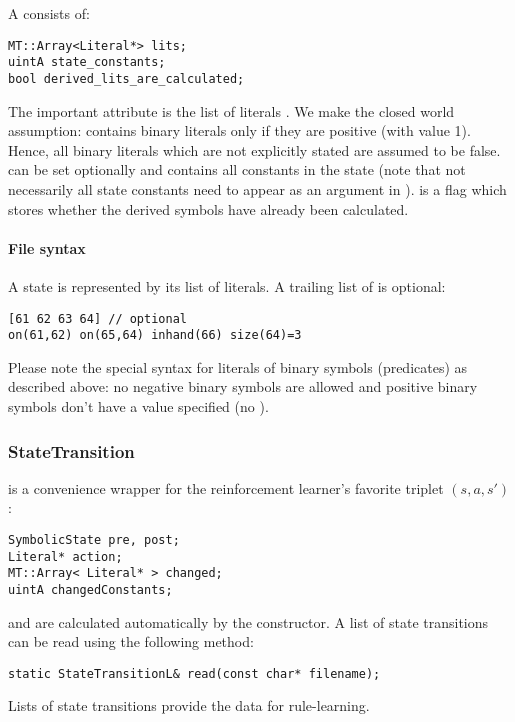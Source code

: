 \documentclass[10pt,twoside,twocolumn,fleqn]{article}
\begin{document}
A  consists of:
\begin{lstlisting}
MT::Array<Literal*> lits;
uintA state_constants;
bool derived_lits_are_calculated;
\end{lstlisting}
The important attribute is the list of literals . We make the 
closed world assumption:  contains binary literals only if
they are positive (with value 1). Hence, all binary literals which are not
explicitly stated are assumed to be false.  can be
set optionally and contains all constants in the state (note that not
necessarily all state constants need to appear as an argument in
).  is a flag which stores
whether the derived symbols have already been calculated.



\paragraph{File syntax}

A state is represented by its list of literals. A trailing list of
 is optional:
\begin{lstlisting}
[61 62 63 64] // optional
on(61,62) on(65,64) inhand(66) size(64)=3
\end{lstlisting}
Please note the special syntax for literals of binary symbols
(predicates) as described above: no negative binary symbols are allowed
and positive binary symbols don't have a value specified (no ).



\subsubsection{StateTransition}
\label{sec:state-transition}

 is a convenience wrapper for the reinforcement
learner's favorite triplet $(s,a,s')$:
\begin{lstlisting}
SymbolicState pre, post;
Literal* action;
MT::Array< Literal* > changed;
uintA changedConstants;
\end{lstlisting}
 and  are calculated
automatically by the constructor. A list of state transitions can be read
using the following method:
\begin{lstlisting}
static StateTransitionL& read(const char* filename);
\end{lstlisting}
Lists of state transitions provide the data for rule-learning.
\end{document}
